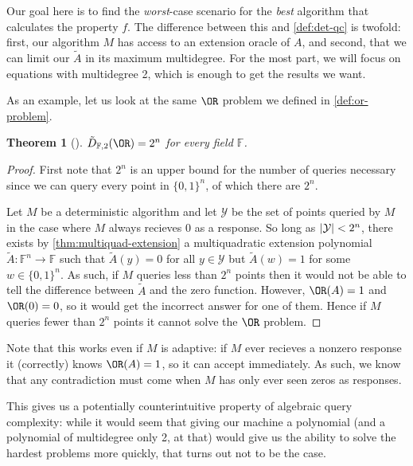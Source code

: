 \documentclass[english]{reedthesis}
\theoremstyle{plain}
\newtheorem{thm}{Theorem}[section]
\theoremstyle{definition}
\theoremstyle{remark}
\DeclarePairedDelimiter{\abs}{\lvert}{\rvert}
\begin{document}
Our goal here is to find the \emph{worst}-case scenario for the \emph{best}
algorithm that calculates the property $f$. The difference between this and
\cref{def:det-qc} is twofold: first, our algorithm $M$ has access to
an extension oracle of $A$, and second, that we can limit our $\tilde{A}$ in
its maximum multidegree. For the most part, we will focus on equations with
multidegree 2, which is enough to get the results we want.

As an example, let us look at the same $\OR$ problem we defined in
\cref{def:or-problem}.

\begin{thm}[{\cite[Thm.\ 4.4]{AW09}}]\label{thm:or-algebraic}
  $\tilde{D}_{\mathbb{F},2}(\OR) = 2^{n}$ for every field $\mathbb{F}$.
\end{thm}

\begin{proof}
  First note that $2^{n}$ is an upper bound for the number of queries necessary
  since we can query every point in $\{0, 1\}^{n}$, of which there are $2^{n}$.

  Let $M$ be a deterministic algorithm and let $\mathcal{Y}$ be the set of points queried
  by $M$ in the case where $M$ always recieves $0$ as a response. So long as
  $\abs{\mathcal{Y}} < 2^{n}$, there exists by \cref{thm:multiquad-extension} a
  multiquadratic extension polynomial $\tilde{A}: \mathbb{F}^{n} \rightarrow \mathbb{F}$
  such that $\tilde{A}(y) = 0$ for all $y \in \mathcal{Y}$ but $\tilde{A}(w) = 1$ for some
  $w \in \{0, 1\}^{n}$. As such, if $M$ queries less than $2^{n}$ points then it
  would not be able to tell the difference between $\tilde{A}$ and the zero
  function. However, $\OR(A) = 1$ and $\OR(0) = 0$, so it would get the
  incorrect answer for one of them. Hence if $M$ queries fewer than $2^{n}$
  points it cannot solve the $\OR$ problem.
\end{proof}

Note that this works even if $M$ is adaptive: if $M$ ever recieves a nonzero
response it (correctly) knows $\OR(A) = 1$, so it can accept immediately. As
such, we know that any contradiction must come when $M$ has only ever seen zeros
as responses.

This gives us a potentially counterintuitive property of algebraic query
complexity: while it would seem that giving our machine a polynomial (and a
polynomial of multidegree only 2, at that) would give us the ability to solve
the hardest problems more quickly, that turns out not to be the case.
\end{document}
